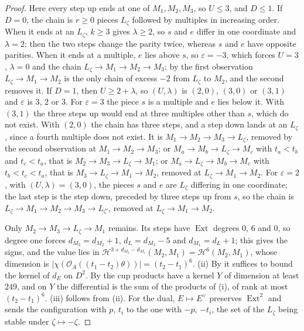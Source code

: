 \documentclass[11pt,reqno]{amsart}
\theoremstyle{plain}
\theoremstyle{definition}
\theoremstyle{remark}
\newcommand{\cO}{\mathcal{O}}
\newcommand{\cH}{\mathcal{H}}
\DeclareMathOperator{\Ext}{Ext}
\begin{document}
\begin{proof}
Here every step up ends at one of $M_{1},M_{2},M_{3}$, so $U\le3$, and
$D\le1$. If $D=0$, the chain is $r\ge0$ pieces $L_{\zeta}$ followed by
multiples in increasing order. When it ends at an $L_{\zeta}$, $k\ge3$ gives
$\lambda\ge2$, so $s$ and $e$ differ in one coordinate and $\lambda=2$; then
the two steps change the parity twice, whereas $s$ and $e$ have opposite
parities. When it ends at a multiple, $e$ lies above $s$, so $\varepsilon=-3$,
which forces $U=3$, $\lambda=0$ and the chain $L_{\zeta}\to M_{1}\to
M_{2}\to M_{3}$; by the first observation $L_{\zeta}\to M_{1}\to M_{2}$ is the
only chain of excess $-2$ from $L_{\zeta}$ to $M_{2}$, and the second removes
it. If $D=1$, then $U\ge2+\lambda$, so $(U,\lambda)$ is $(2,0)$, $(3,0)$ or
$(3,1)$ and $\varepsilon$ is $3$, $2$ or $3$. For $\varepsilon=3$ the piece
$s$ is a multiple and $e$ lies below it. With $(3,1)$ the three steps up
would end at three multiples other than $s$, which do not exist. With $(2,0)$
the chain has three steps, and a step down lands at an $L_{\zeta}$, since a
fourth multiple does not exist. It is $M_{1}\to M_{2}\to M_{3}\to L_{\zeta}$,
removed by the second observation at $M_{1}\to M_{2}\to M_{3}$; or
$M_{a}\to M_{b}\to L_{\zeta}\to M_{c}$ with $t_{a}<t_{b}$ and $t_{c}<t_{a}$,
that is $M_{2}\to M_{3}\to L_{\zeta}\to M_{1}$; or
$M_{a}\to L_{\zeta}\to M_{b}\to M_{c}$ with $t_{b}<t_{c}<t_{a}$, that is
$M_{3}\to L_{\zeta}\to M_{1}\to M_{2}$, removed at $L_{\zeta}\to M_{1}\to
M_{2}$. For $\varepsilon=2$, with $(U,\lambda)=(3,0)$, the pieces $s$ and $e$
are $L_{\zeta}$ differing in one coordinate; the last step is the step down,
preceded by three steps up from $s$, so the chain is $L_{\zeta}\to M_{1}\to
M_{2}\to M_{3}\to L_{\zeta'}$, removed at $L_{\zeta}\to M_{1}\to M_{2}$.

Only $M_{2}\to M_{3}\to L_{\zeta}\to M_{1}$ remains. Its steps have $\Ext$
degrees $0$, $6$ and $0$, so degree one forces $d_{M_{3}}=d_{M_{2}}+1$,
$d_{L}=d_{M_{3}}-5$ and $d_{M_{1}}=d_{L}+1$; this gives the signs, and the
value lies in
$\cH^{3+d_{M_{2}}-d_{M_{1}}}(M_{2},M_{1})=\cH^{6}(M_{2},M_{1})$, whose
dimension is $|\chi(\cO_{A}((t_{1}-t_{2})\theta))|=(t_{2}-t_{1})^{6}$.
(ii) By  it suffices to bound the kernel of $d_{E}$
on $D^{2}$. By  the cup products have a kernel $Y$ of
dimension at least $249$, and on $Y$ the differential is the sum of the
products of (i), of rank at most $(t_{2}-t_{1})^{6}$. (iii) follows from
(ii). For the dual, $E\mapsto E^{\vee}$ preserves $\Ext^{2}$ and sends the
configuration with $p$, $t_{i}$ to the one with $-p$, $-t_{i}$, the set of
the $L_{\zeta}$ being stable under $\zeta\mapsto-\zeta$.
\end{proof}
\end{document}
